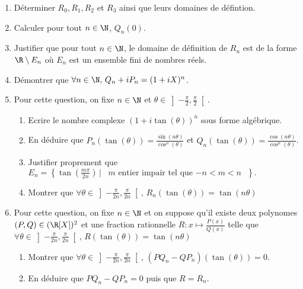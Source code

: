 \begin{exercice}
\begin{enumerate}
\item Déterminer $R_0,R_1,R_2 $ et $R_3$ ainsi que leurs domaines de défintion. 
\item Calculer pour tout $n\in \N$, $Q_n(0)$. 
\item Justifier que pour tout $n\in \N$, le domaine de définition de $R_n$ est de la forme $\R\setminus E_n$ où $E_n$ est un ensemble fini de nombres réels. 
\item Démontrer que $\forall n \in \N,\, Q_n +iP_n = (1+iX)^n $.
\item Pour cette question, on fixe $n\in \N$ et $\theta \in \left] -\frac{\pi}{2},\frac{\pi}{2}\right[.$
\begin{enumerate}
\item Ecrire le nombre complexe $(1+i \tan(\theta))^n$ sous forme algébrique. 
\item En déduire que $P_n(\tan(\theta) )= \frac{\sin(n\theta)}{\cos^n(\theta)}$ et $Q_n(\tan(\theta) )= \frac{\cos(n\theta)}{\cos^n(\theta)}$.
\item Justifier proprement que $E_n = \left\{ \tan\left( \frac{m\pi}{2n}\right)\,|\, \text{ $m$ entier impair tel que $-n<m<n$ } \right\}.$ 
\item Montrer que $\forall  \theta \in \left] -\frac{\pi}{2n},\frac{\pi}{2n}\right[,\, R_n(\tan(\theta)) =\tan(n\theta)$
\end{enumerate}
\item Pour cette question, on fixe $n\in \N$ et on suppose qu'il existe deux polynomes $(P,Q) \in ( \R[X])^2$ et une fraction rationnelle $R : x\mapsto \frac{P(x)}{Q(x)}$ telle que $\forall  \theta \in \left] -\frac{\pi}{2n},\frac{\pi}{2n}\right[,\, R(\tan(\theta)) =\tan(n\theta)$
\begin{enumerate}
\item Montrer que  $\forall  \theta \in \left] -\frac{\pi}{2n},\frac{\pi}{2n}\right[,\, (PQ_n- QP_n)(\tan(\theta) ) =0$.
\item En déduire que $PQ_n- QP_n=0$ puis que $R=R_n$. 
\end{enumerate}
\end{enumerate}

\end{exercice}



